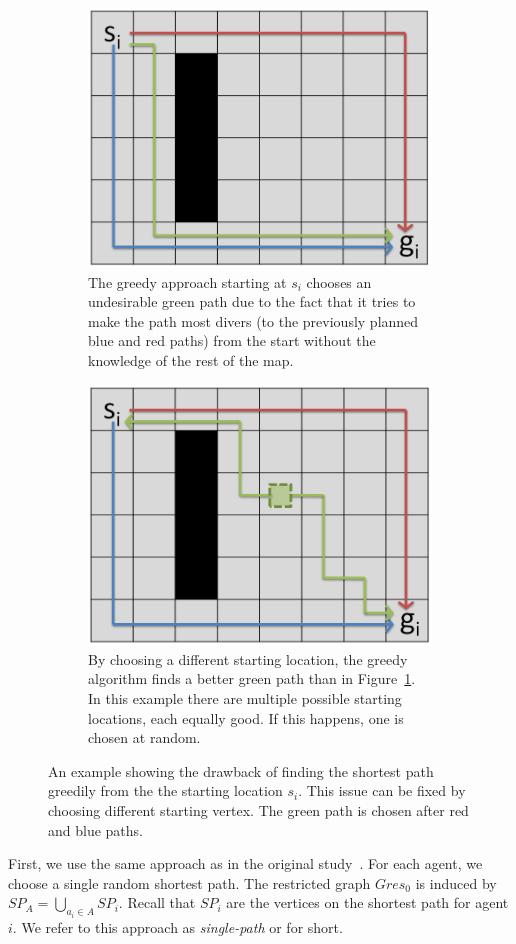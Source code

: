 \begin{figure}[ht]
\centering

\begin{subfigure}[t]{0.99\columnwidth}
\centering
\includegraphics[width=0.45\columnwidth]{img/distant_wrong.PNG}
\caption{The greedy approach starting at $s_i$ chooses an undesirable green path due to the fact that it tries to make the path most divers (to the previously planned blue and red paths) from the start without the knowledge of the rest of the map.} %
\label{fig:distant_wrong}
\end{subfigure}
\hfill
\begin{subfigure}[t]{0.99\columnwidth}
\centering
\includegraphics[width=0.45\columnwidth]{img/distant_ok.PNG}
\caption{By choosing a different starting location, the greedy algorithm finds a better green path than in Figure~\ref{fig:distant_wrong}. In this example there are multiple possible starting locations, each equally good. If this happens, one is chosen at random.}
\label{fig:distant_ok}
\end{subfigure}

\caption{An example showing the drawback of finding the shortest path greedily from the the starting location $s_i$. This issue can be fixed by choosing different starting vertex. The green path is chosen after red and blue paths.}
\label{fig:distant}
\end{figure}

First, we use the same approach as in the original study~\cite{AAMAS_corridors}.
For each agent, we choose a single random shortest path. The restricted graph $Gres_{0}$ is induced by $SP_A = \bigcup_{a_i \in A} SP_i$. Recall that $SP_i$ are the vertices on the shortest path for agent $i$. We refer to this approach as \emph{single-path} or \pss{} for short.



